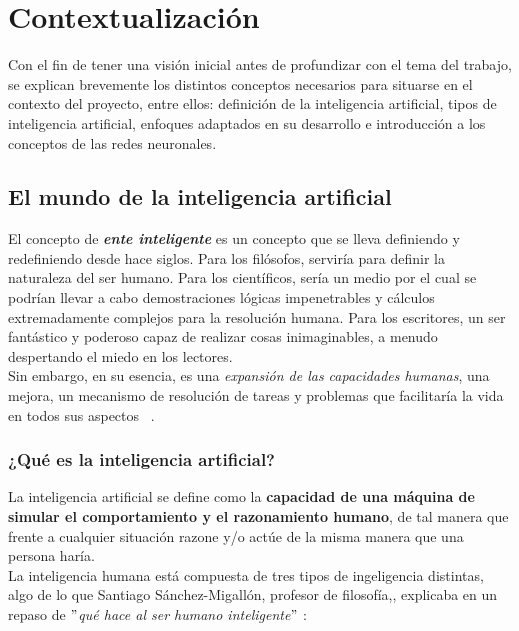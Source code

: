 
\chapter{Contextualización}\label{contextualizacion}

Con el fin de tener una visión inicial antes de profundizar con el tema del trabajo, se explican brevemente los distintos conceptos necesarios para situarse en el contexto del proyecto, entre ellos: definición de la inteligencia artificial, tipos de inteligencia artificial, enfoques adaptados en su desarrollo e introducción a los conceptos de las redes neuronales.

\section{El mundo de la inteligencia artificial}

El concepto de \textbf{\textit{ente inteligente}} es un concepto que se lleva definiendo y redefiniendo desde hace siglos. Para los filósofos, serviría para definir la naturaleza del ser humano. Para los científicos, sería un medio por el cual se podrían llevar a cabo demostraciones lógicas impenetrables y cálculos extremadamente complejos para la resolución humana. Para los escritores, un ser fantástico y poderoso capaz de realizar cosas inimaginables, a menudo despertando el miedo en los lectores. \\

Sin embargo, en su esencia, es una \textit{expansión de las capacidades humanas}, una mejora, un mecanismo de resolución de tareas y problemas que facilitaría la vida en todos sus aspectos ~\cite{buchanan2005very}.

\subsection{¿Qué es la inteligencia artificial?}

La inteligencia artificial se define como la \textbf{capacidad de una máquina de simular el comportamiento y el razonamiento humano}, de tal manera que frente a cualquier situación razone y/o actúe de la misma manera que una persona haría. \\

La inteligencia humana está compuesta de tres tipos de ingeligencia distintas, algo de lo que Santiago Sánchez-Migallón, profesor de filosofía,, explicaba en un repaso de $"$\textit{qué hace al ser humano inteligente}$"$ \cite{pastor2008inteligencia}: 

